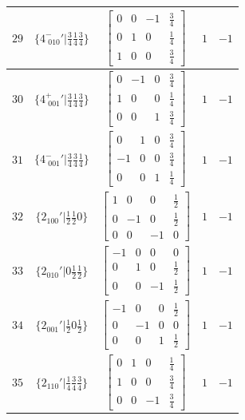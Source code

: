 \documentclass[fleqn,8pt]{jsarticle}
\begin{document}
\begin{longtable}{ccccc}
$ 29 $ & $ \{4^{-}_{\,\,010}{}'|\frac{3}{4} \frac{1}{4} \frac{3}{4}\} $ & $ \begin{bmatrix} 0 & 0 & -1 & \frac{3}{4} \\ 0 & 1 & 0 & \frac{1}{4} \\ 1 & 0 & 0 & \frac{3}{4} \end{bmatrix} $ & $ 1 $ & $ -1 $ \\ \hline
$ 30 $ & $ \{4^{+}_{\,\,001}{}'|\frac{3}{4} \frac{1}{4} \frac{3}{4}\} $ & $ \begin{bmatrix} 0 & -1 & 0 & \frac{3}{4} \\ 1 & 0 & 0 & \frac{1}{4} \\ 0 & 0 & 1 & \frac{3}{4} \end{bmatrix} $ & $ 1 $ & $ -1 $ \\ \hline
$ 31 $ & $ \{4^{-}_{\,\,001}{}'|\frac{3}{4} \frac{3}{4} \frac{1}{4}\} $ & $ \begin{bmatrix} 0 & 1 & 0 & \frac{3}{4} \\ -1 & 0 & 0 & \frac{3}{4} \\ 0 & 0 & 1 & \frac{1}{4} \end{bmatrix} $ & $ 1 $ & $ -1 $ \\ \hline
$ 32 $ & $ \{2{}_{100}{}'|\frac{1}{2} \frac{1}{2} 0\} $ & $ \begin{bmatrix} 1 & 0 & 0 & \frac{1}{2} \\ 0 & -1 & 0 & \frac{1}{2} \\ 0 & 0 & -1 & 0 \end{bmatrix} $ & $ 1 $ & $ -1 $ \\ \hline
$ 33 $ & $ \{2{}_{010}{}'|0 \frac{1}{2} \frac{1}{2}\} $ & $ \begin{bmatrix} -1 & 0 & 0 & 0 \\ 0 & 1 & 0 & \frac{1}{2} \\ 0 & 0 & -1 & \frac{1}{2} \end{bmatrix} $ & $ 1 $ & $ -1 $ \\ \hline
$ 34 $ & $ \{2{}_{001}{}'|\frac{1}{2} 0 \frac{1}{2}\} $ & $ \begin{bmatrix} -1 & 0 & 0 & \frac{1}{2} \\ 0 & -1 & 0 & 0 \\ 0 & 0 & 1 & \frac{1}{2} \end{bmatrix} $ & $ 1 $ & $ -1 $ \\ \hline
$ 35 $ & $ \{2{}_{110}{}'|\frac{1}{4} \frac{3}{4} \frac{3}{4}\} $ & $ \begin{bmatrix} 0 & 1 & 0 & \frac{1}{4} \\ 1 & 0 & 0 & \frac{3}{4} \\ 0 & 0 & -1 & \frac{3}{4} \end{bmatrix} $ & $ 1 $ & $ -1 $ \\ \hline

\end{longtable}
\end{document}
